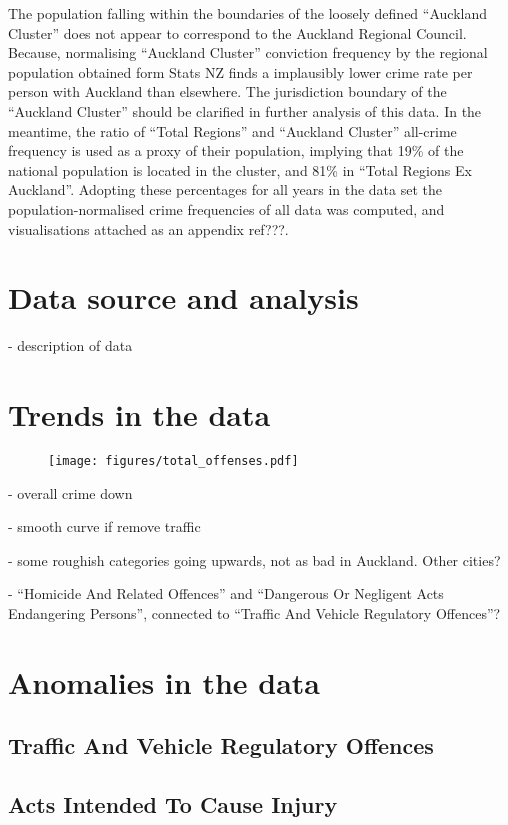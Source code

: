 \documentclass[onecolumn]{mysimple}
\begin{document}
The population falling within the boundaries of the loosely defined ``Auckland Cluster'' does not appear to correspond to the Auckland Regional Council.
Because, normalising ``Auckland Cluster'' conviction frequency by the regional population obtained form Stats NZ finds a implausibly lower crime rate per person with Auckland than elsewhere.
The jurisdiction boundary of the ``Auckland Cluster'' should be clarified in further analysis of this data.
In the meantime, the ratio of ``Total Regions'' and ``Auckland Cluster'' all-crime frequency is used as a proxy of their population, implying that 19\% of the national population is located in the cluster, and 81\% in ``Total Regions Ex Auckland''.
Adopting these percentages for all years in the data set the population-normalised crime frequencies of all data was computed, and visualisations attached as an appendix ref???.

\section*{Data source and analysis}

 - description of data

 
\section*{Trends in the data}

\begin{figure}
  \texttt{[image: figures/total\_offenses.pdf]}
\end{figure}

 - overall crime down
 
 - smooth curve if remove traffic
 
 - some roughish categories going upwards, not as bad in Auckland. Other cities?

 - ``Homicide And Related Offences'' and ``Dangerous Or Negligent Acts Endangering Persons'', connected to ``Traffic And Vehicle Regulatory Offences''?

\section*{Anomalies in the data}

\subsection*{Traffic And Vehicle Regulatory Offences}
\subsection*{Acts Intended To Cause Injury}
\end{document}
